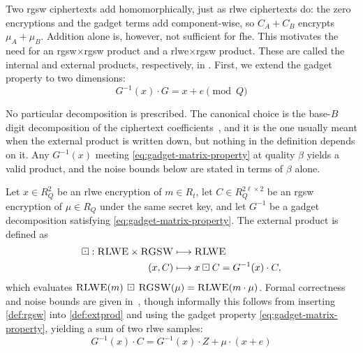 Two \gls{rgsw} ciphertexts add homomorphically, just as \gls{rlwe} ciphertexts do: the zero encryptions and the gadget terms add component-wise, so $C_A + C_B$ encrypts $\mu_A + \mu_B$. Addition alone is, however, not sufficient for \gls{fhe}. This motivates the need for an \gls{rgsw}$\times$\gls{rgsw} product and a \gls{rlwe}$\times$\gls{rgsw} product. These are called the internal and external products, respectively, in \cite{cryptoeprint:2018/421}. First, we extend the gadget property to two dimensions:
\begin{equation}
    \label{eq:gadget-matrix-property}
    G^{-1}(x)\cdot G = x + e \pmod{Q}%
\end{equation}

No particular decomposition is prescribed. The canonical choice is the base-$B$ digit decomposition of the ciphertext coefficients~\cite{cryptoeprint:2018/421}, and it is the one usually meant when the external product is written down, but nothing in the definition depends on it. Any $G^{-1}(x)$ meeting \eqref{eq:gadget-matrix-property} at quality $\beta$ yields a valid product, and the noise bounds below are stated in terms of $\beta$ alone.

\begin{definition}
    \label{def:prod:external}
    Let $x \in R_Q^2$ be an \gls{rlwe} encryption of $m \in R_t$, let $C \in R_Q^{2\ell\times 2}$ be an \gls{rgsw} encryption of $\mu \in R_Q$ under the same secret key, and let $G^{-1}$ be a gadget decomposition satisfying \eqref{eq:gadget-matrix-property}. The {external product} is defined as
    \begin{align}
        \boxdot: \Call{RLWE}{} \times \Call{RGSW}{} &\longmapsto \Call{RLWE}{} \nonumber \\
        \label{def:extprod}
        (x, C) &\longmapsto x \boxdot C = G^{-1}(x) \cdot C,
    \end{align}
    which evaluates $\Call{RLWE}{m}\,\boxdot\,\Call{RGSW}{\mu} = \Call{RLWE}{m\cdot\mu}$. Formal correctness and noise bounds are given in~\cite{cryptoeprint:2018/421}, though informally this follows from inserting \eqref{def:rgsw} into \eqref{def:extprod} and using the gadget property \eqref{eq:gadget-matrix-property}, yielding a sum of two \gls{rlwe} samples:
    \begin{equation}
        \label{eq:extprod-expansion}
        G^{-1}(x)\cdot C = G^{-1}(x)\cdot Z + \mu\cdot(x + e)
    \end{equation}
\end{definition}

